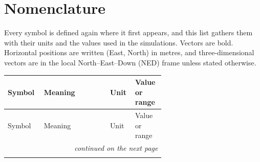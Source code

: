 \section*{Nomenclature}

Every symbol is defined again where it first appears, and this list gathers them with their units and the values used in the simulations.
Vectors are bold.
Horizontal positions are written (East, North) in metres, and three-dimensional vectors are in the local North--East--Down (NED) frame unless stated otherwise.

\small
\setlength{\LTpre}{6pt}
\setlength{\LTpost}{6pt}
\begin{longtable}{@{}l >{\raggedright\arraybackslash}p{0.42\linewidth} l >{\raggedright\arraybackslash}p{0.19\linewidth}@{}}
\toprule
Symbol & Meaning & Unit & Value or range \\
\midrule
\endfirsthead
\toprule
Symbol & Meaning & Unit & Value or range \\
\midrule
\endhead
\midrule
\multicolumn{4}{r}{\textit{continued on the next page}} \\
\endfoot
\bottomrule
\endlastfoot


\end{longtable}
